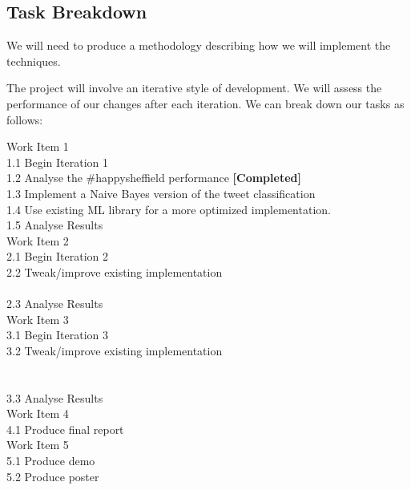 \subsection{Task Breakdown}

We will need to produce a methodology describing how we will implement the techniques.

The project will involve an iterative style of development. We will assess the performance of our changes after each iteration. We can break down our tasks as follows:

Work Item 1\\
1.1 Begin Iteration 1\\
1.2 Analyse the \#happysheffield performance \textbf{[Completed]}\\
1.3 Implement a Naive Bayes version of the tweet classification\\
1.4 Use existing ML library \cite{scikit} for a more optimized implementation. \\
1.5 Analyse Results\\

Work Item 2\\
2.1 Begin Iteration 2\\
2.2 Tweak/improve existing implementation\\
\\
2.3 Analyse Results\\

Work Item 3\\
3.1 Begin Iteration 3\\
3.2 Tweak/improve existing implementation\\
\\
\\
3.3 Analyse Results\\

Work Item 4\\
4.1 Produce final report\\

Work Item 5\\
5.1 Produce demo\\
5.2 Produce poster\\



